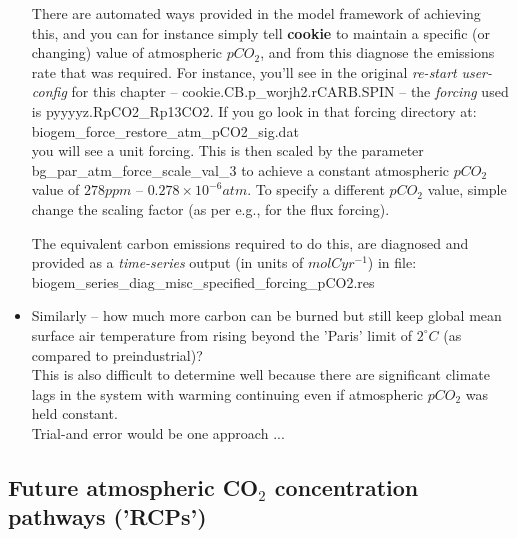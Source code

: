 \begin{itemize}[noitemsep]
\vspace{2mm}

There are automated ways provided in the model framework of  achieving this, and you can for instance simply tell \textbf{cookie}  to maintain a specific (or changing) value of atmospheric \(pCO_{2}\), and from this diagnose the emissions rate that was required. For instance, you'll see in the original \textit{re-start} \textit{user-config} for this chapter -- \textsf{\footnotesize cookie.CB.p\_worjh2.rCARB.SPIN} -- the \textit{forcing} used is 
\textsf{\footnotesize pyyyyz.RpCO2\_Rp13CO2}. If you go look in that forcing directory at:
\vspace{1mm}
\\\textsf{\footnotesize biogem\_force\_restore\_atm\_pCO2\_sig.dat} 
\vspace{1mm}
\\you will see a unit forcing. This is then scaled by the parameter \textsf{\footnotesize bg\_par\_atm\_force\_scale\_val\_3} to achieve a constant atmospheric \(pCO_{2}\) value of \(278 ppm\) --  \(0.278\times10^{-6} atm\). To specify a different \(pCO_{2}\) value, simple change the scaling factor (as per e.g., for the flux forcing).

The equivalent carbon emissions required to do this, are diagnosed and provided as a \textit{time-series} output (in units of \(mol C yr^{-1}\)) in file: \\\textsf{\footnotesize biogem\_series\_diag\_misc\_specified\_forcing\_pCO2.res}

\vspace{1mm}
\item Similarly -- how much more carbon can be burned but still keep global mean surface air temperature from rising beyond the 'Paris' limit of \(2^{\circ}C\) (as compared to preindustrial)?
\\This is also difficult to determine well because there are significant climate lags in the system with warming continuing even if atmospheric \(pCO_{2}\) was held constant.
\\Trial-and error would be one approach ...

\end{itemize}


\subsection{Future atmospheric CO$_{2}$ concentration pathways ('RCPs')}

